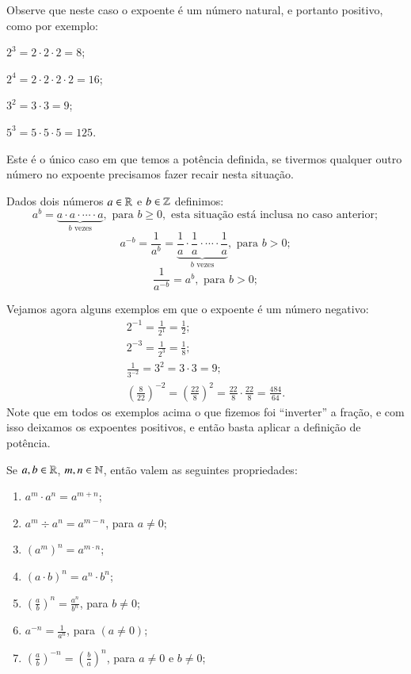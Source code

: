  \vskip0.3cm

 \begin{exem}
 Observe que neste caso o expoente é um número natural, e portanto positivo, como por exemplo:

  $2^3= 2 \cdot 2 \cdot 2= 8$;

  $2^4=2 \cdot 2 \cdot 2 \cdot  2= 16$;

  $3^2= 3 \cdot 3= 9$;

  $5^3= 5 \cdot 5 \cdot 5= 125$.

  Este é o único caso em que temos a potência definida, se tivermos qualquer outro número no expoente precisamos fazer recair nesta situação.
 \end{exem}


 \vskip0.3cm

 \colorbox{azul}{
 \begin{minipage}{0.9\linewidth}
 \begin{center}
   Dados dois números $a \in \mathbb{R}$ e $b \in \mathbb{Z}$ definimos:
 \[a^b= \underbrace{a \cdot a \cdot \cdots \cdot a}_{b \text{ vezes}}, \text{ para } b\geq0, \text{ esta situação está inclusa no caso anterior};\]
 \[a^{-b}= \frac{1}{a^b}= \underbrace{\frac{1}{a} \cdot \frac{1}{a} \cdot \cdots \cdot \frac{1}{a}}_{b \text{ vezes}}, \text{ para } b>0 ;\]
 \[\frac{1}{a^{-b}}= a^b, \text{ para } b>0;\]
 \end{center}
 \end{minipage}}

 \vskip0.3cm

 \begin{exem}
 Vejamos agora alguns exemplos em que o expoente é um número negativo:
 \begin{eqnarray*}
  2^{-1}= \frac{1}{2^{1}}= \frac{1}{2}; \\
  2^{-3}= \frac{1}{2^3}= \frac{1}{8}; \\
  \frac{1}{3^{-2}}= 3^2= 3 \cdot 3= 9; \\
  \left( \frac{8}{22} \right)^{-2}= \left( \frac{22}{8} \right)^{2}= \frac{22}{8} \cdot \frac{22}{8}= \frac{484}{64}.
 \end{eqnarray*}
 Note que em todos os exemplos acima o que fizemos foi ``inverter'' a fração, e com isso deixamos os expoentes positivos, e então basta aplicar a definição de potência.

 \end{exem}

 
 Se $a, b \in \mathbb{R}$, $m, n \in \mathbb{N}$, então valem as seguintes propriedades:
 \begin{enumerate}[P1)]
 \item $a^m \cdot a^n= a^{m + n}$;
 \item $a^m \div a^n= a^{m - n}$, para $a \neq 0$;
 \item $(a^m)^n= a^{m \cdot n}$;
 \item $(a \cdot b)^n= a^n \cdot b^n$;
 \item $\left(\frac{a}{b}\right)^n= \frac{a^n}{b^n}$, para $b \neq 0$;
 \item $a^{-n}= \frac{1}{a^n}$, para $(a \neq 0)$;
 \item $\left(\frac{a}{b} \right)^{-n}= \left(\frac{b}{a} \right)^{n}$, para $a \neq 0$ e $b \neq 0$;
 \end{enumerate}
 
